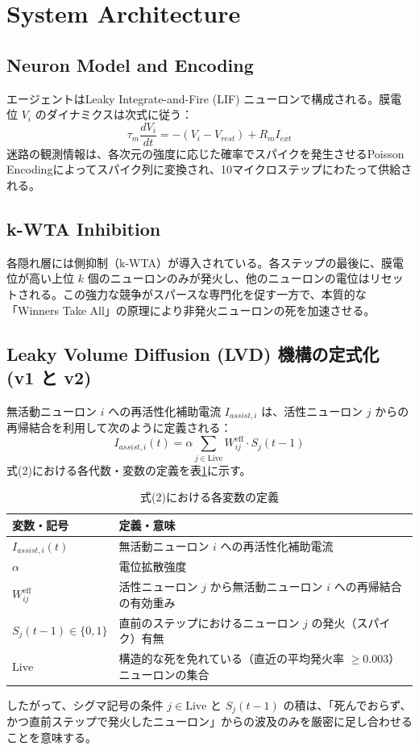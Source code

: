 \documentclass[submit]{ipsj}
\begin{document}
\section{System Architecture}
\subsection{Neuron Model and Encoding}
エージェントはLeaky Integrate-and-Fire (LIF) ニューロンで構成される\cite{abbott1999lapicque}。膜電位 $V_i$ のダイナミクスは次式に従う：
\begin{equation}
\tau_m \frac{dV_i}{dt} = -(V_i - V_{rest}) + R_m I_{ext}
\end{equation}
迷路の観測情報は、各次元の強度に応じた確率でスパイクを発生させるPoisson Encodingによってスパイク列に変換され、10マイクロステップにわたって供給される\cite{10.1371/journal.pcbi.0030031}。

\subsection{k-WTA Inhibition}
各隠れ層には側抑制（k-WTA）が導入されている。各ステップの最後に、膜電位が高い上位 $k$ 個のニューロンのみが発火し、他のニューロンの電位はリセットされる。この強力な競争がスパースな専門化を促す一方で、本質的な「Winners Take All」の原理により非発火ニューロンの死を加速させる\cite{oster2009winner}。

\subsection{Leaky Volume Diffusion (LVD) 機構の定式化 (v1 と v2)}
無活動ニューロン $i$ への再活性化補助電流 $I_{assist,i}$ は、活性ニューロン $j$ からの再帰結合を利用して次のように定義される：
\begin{equation}
I_{assist,i}(t) = \alpha \sum_{j \in \text{Live}} W_{ij}^{\text{eff}} \cdot S_j(t-1)
\end{equation}
式(2)における各代数・変数の定義を表\ref{tab:variables}に示す。
\begin{table}[htbp]
\centering
\caption{式(2)における各変数の定義}
\label{tab:variables}
\begin{tabular}{lp{4.5cm}}
\toprule
変数・記号 & 定義・意味 \\ \midrule
$I_{assist,i}(t)$ & 無活動ニューロン $i$ への再活性化補助電流 \\
$\alpha$ & 電位拡散強度 \\
$W_{ij}^{\text{eff}}$ & 活性ニューロン $j$ から無活動ニューロン $i$ への再帰結合の有効重み \\
$S_j(t-1) \in \{0,1\}$ & 直前のステップにおけるニューロン $j$ の発火（スパイク）有無 \\
$\text{Live}$ & 構造的な死を免れている（直近の平均発火率 $\ge 0.003$）ニューロンの集合 \\ \bottomrule
\end{tabular}
\end{table}
したがって、シグマ記号の条件 $j \in \text{Live}$ と $S_j(t-1)$ の積は、「死んでおらず、かつ直前ステップで発火したニューロン」からの波及のみを厳密に足し合わせることを意味する。
\end{document}
